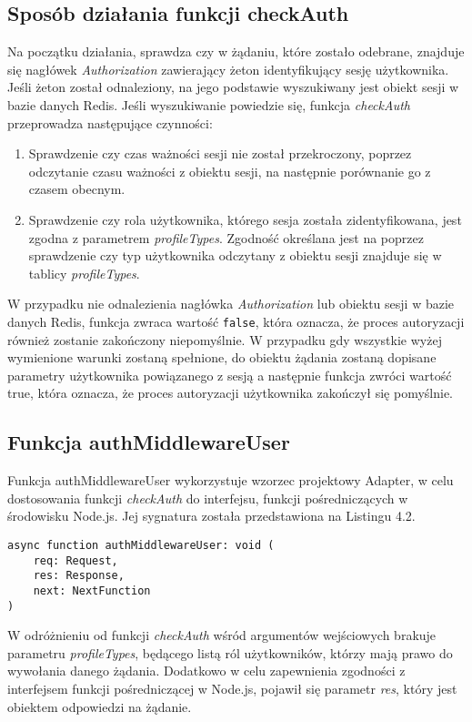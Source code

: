 \documentclass[a4paper,12pt,twoside,openany]{report}
\begin{document}
\subsection{Sposób działania funkcji checkAuth}
Na początku działania, sprawdza czy w żądaniu, które zostało odebrane, znajduje się nagłówek \textit{Authorization} zawierający żeton identyfikujący sesję użytkownika. Jeśli żeton został odnaleziony, na jego podstawie wyszukiwany jest obiekt sesji w bazie danych Redis. Jeśli wyszukiwanie powiedzie się, funkcja \textit{checkAuth} przeprowadza następujące czynności:
\begin{enumerate}	
	\item Sprawdzenie czy czas ważności sesji nie został przekroczony, poprzez odczytanie czasu ważności z obiektu sesji, na następnie porównanie go z czasem obecnym. 
	
	\item Sprawdzenie czy rola użytkownika, którego sesja została zidentyfikowana, jest zgodna z parametrem \textit{profileTypes}. Zgodność określana jest na poprzez sprawdzenie czy typ użytkownika odczytany z obiektu sesji znajduje się w tablicy \textit{profileTypes}.
\end{enumerate}
W przypadku nie odnalezienia nagłówka \textit{Authorization} lub obiektu sesji w bazie danych Redis, funkcja zwraca wartość \verb|false|, która oznacza, że proces autoryzacji również zostanie zakończony niepomyślnie. W przypadku gdy wszystkie wyżej wymienione warunki zostaną spełnione, do obiektu żądania zostaną dopisane parametry użytkownika powiązanego z sesją a następnie funkcja zwróci wartość true, która oznacza, że proces autoryzacji użytkownika zakończył się pomyślnie.

\subsection{Funkcja authMiddlewareUser}
Funkcja authMiddlewareUser wykorzystuje wzorzec projektowy Adapter, w celu dostosowania funkcji \textit{checkAuth} do interfejsu, funkcji pośredniczących w środowisku Node.js. Jej sygnatura została przedstawiona na Listingu 4.2.
\begin{lstlisting}[caption=Sygnatura funkcji authMiddlewareUser,label=code1,captionpos=b]
async function authMiddlewareUser: void (
	req: Request,
	res: Response,
	next: NextFunction
)
\end{lstlisting}
W odróżnieniu od funkcji \textit{checkAuth} wśród argumentów wejściowych brakuje parametru \textit{profileTypes}, będącego listą ról użytkowników, którzy mają prawo do wywołania danego żądania. Dodatkowo w celu zapewnienia zgodności z interfejsem funkcji pośredniczącej w Node.js, pojawił się parametr \textit{res}, który jest obiektem odpowiedzi na żądanie.   
\end{document}
